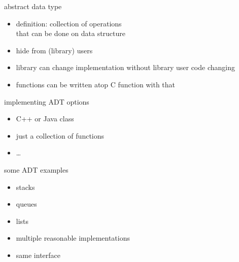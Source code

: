 \begin{frame}{abstract data type}
\begin{itemize}
\item definition: collection of operations \\
      that can be done on data structure
\vspace{.5cm}
\item<2-> hide  from (library) users
\item<2-> library can change implementation without library user code changing
\item<2-> functions can be written atop C function with that
\end{itemize}
\end{frame}

\begin{frame}{implementing ADT options}
    \begin{itemize}
    \item C++ or Java class
    \item just a collection of functions
    \item \ldots
    \end{itemize}
\end{frame}

\begin{frame}{some ADT examples}
    \begin{itemize}
        \item stacks
        \item queues
        \item lists
            \vspace{.5cm}
        \item multiple reasonable implementations
        \item same interface
    \end{itemize}
\end{frame}

